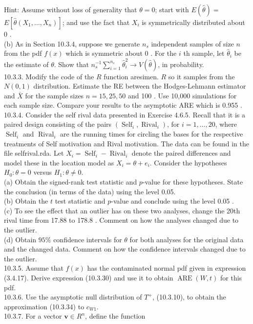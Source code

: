 Hint: Assume without loss of generality that $\theta=0$; start with $E(\widehat{\theta})=$ $E\left[\widehat{\theta}\left(X_{1}, \ldots, X_{n}\right)\right]$; and use the fact that $X_{i}$ is symmetrically distributed about 0 .\\
(b) As in Section 10.3.4, suppose we generate $n_{s}$ independent samples of size $n$ from the pdf $f(x)$ which is symmetric about 0 . For the $i$ th sample, let $\widehat{\theta}_{i}$ be the estimate of $\theta$. Show that $n_{s}^{-1} \sum_{i=1}^{n_{s}} \widehat{\theta}_{i}^{2} \rightarrow V(\widehat{\theta})$, in probability.\\
10.3.3. Modify the code of the $R$ function aresimen. $R$ so it samples from the $N(0,1)$ distribution. Estimate the RE between the Hodges-Lehmann estimator and $\bar{X}$ for the sample sizes $n=15,25,50$ and 100 . Use 10,000 simulations for each sample size. Compare your results to the asymptotic ARE which is 0.955 .\\
10.3.4. Consider the self rival data presented in Exercise 4.6.5. Recall that it is a paired design consisting of the pairs $\left(\operatorname{Self}_{i}, \operatorname{Rival}_{i}\right)$, for $i=1, \ldots, 20$, where $\operatorname{Self}_{i}$ and $\operatorname{Rival}_{i}$ are the running times for circling the bases for the respective treatments of Self motivation and Rival motivation. The data can be found in the file selfrival.rda. Let $X_{i}=\operatorname{Self}_{i}-\operatorname{Rival}_{i}$ denote the paired differences and model these in the location model as $X_{i}=\theta+e_{i}$. Consider the hypotheses $H_{0}: \theta=0$ versus $H_{1}: \theta \neq 0$.\\
(a) Obtain the signed-rank test statistic and $p$-value for these hypotheses. State the conclusion (in terms of the data) using the level 0.05.\\
(b) Obtain the $t$ test statistic and $p$-value and conclude using the level 0.05 .\\
(c) To see the effect that an outlier has on these two analyses, change the 20th rival time from 17.88 to 178.8 . Comment on how the analyses changed due to the outlier.\\
(d) Obtain $95 \%$ confidence intervals for $\theta$ for both analyses for the original data and the changed data. Comment on how the confidence intervals changed due to the outlier.\\
10.3.5. Assume that $f(x)$ has the contaminated normal pdf given in expression (3.4.17). Derive expression (10.3.30) and use it to obtain $\operatorname{ARE}(W, t)$ for this pdf.\\
10.3.6. Use the asymptotic null distribution of $T^{+}$, (10.3.10), to obtain the approximation (10.3.34) to $c_{W 1}$.\\
10.3.7. For a vector $\mathbf{v} \in R^{n}$, define the function


